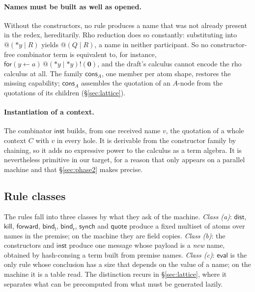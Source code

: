 \documentclass[acmsmall,screen,review,anonymous]{acmart}
\makeatletter
\newcommand{\quo}[1]{@#1}
\newcommand{\drp}[1]{{*}#1}
\newcommand{\inp}[3]{\mathsf{for}(#1 \leftarrow #2)\,#3}
\newcommand{\out}[2]{#1!(#2)}
\newcommand{\nil}{\mathbf{0}}
\newcommand{\cons}{\mathsf{cons}}
\newcommand{\inst}{\mathsf{inst}}
\makeatother
\begin{document}
\paragraph{Names must be built as well as opened.} Without the constructors,
no rule produces a name that was not already present in the redex,
hereditarily. Rho reduction does so constantly: substituting into
$\quo{(\drp{y} \mid R)}$ yields $\quo{(Q \mid R)}$, a name in neither
participant. So no constructor-free combinator term is equivalent to, for
instance, $\inp{y}{a}{\out{\quo{(\drp{y} \mid \drp{y})}}{\nil}}$, and the
draft's calculus cannot encode the rho calculus at all. The family
$\cons_{A}$, one member per atom shape, restores the missing capability;
$\cons_{A}$ assembles the quotation of an $A$-node from the quotations of its
children (\S\ref{sec:lattice}).

\paragraph{Instantiation of a context.} The combinator $\inst$ builds, from
one received name $v$, the quotation of a whole context $C$ with $v$ in every
hole. It is derivable from the constructor family by chaining, so it adds no
expressive power to the calculus as a term algebra. It is nevertheless
primitive in our target, for a reason that only appears on a parallel
machine and that \S\ref{sec:phase2} makes precise.

\subsection{Rule classes}
\label{sec:classes}

The rules fall into three classes by what they ask of the machine.
\emph{Class (a)}: $\mathsf{dist}$, $\mathsf{kill}$, $\mathsf{forward}$,
$\mathsf{bind_l}$, $\mathsf{bind_r}$, $\mathsf{synch}$ and $\mathsf{quote}$
produce a fixed multiset of atoms over names in the premise; on the machine
they are field copies. \emph{Class (b)}: the constructors and $\inst$ produce
one message whose payload is a \emph{new} name, obtained by hash-consing a
term built from premise names. \emph{Class (c)}: $\mathsf{eval}$ is the only
rule whose conclusion has a size that depends on the value of a name; on the
machine it is a table read. The distinction recurs in \S\ref{sec:lattice},
where it separates what can be precomputed from what must be generated
lazily.

\end{document}
